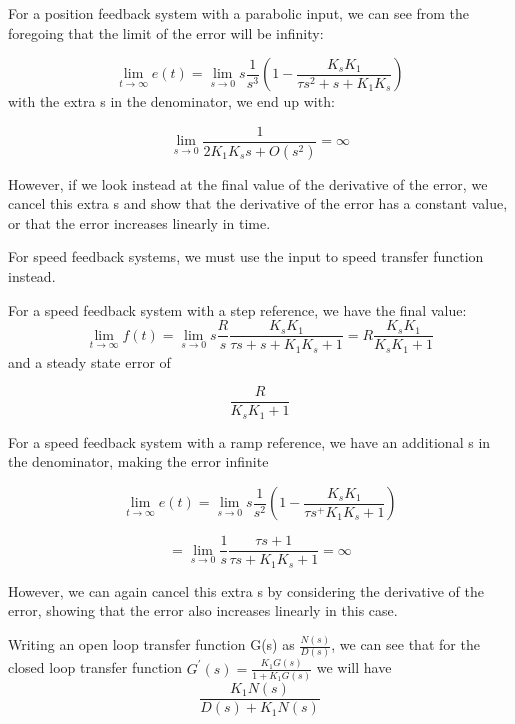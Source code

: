 \documentclass[11pt,a4paper]{article}
\begin{document}
\begin{enumerate}
For a position feedback system with a parabolic input, we can see from the foregoing that the limit of the error will be infinity:

\begin{equation}
	\lim_{t \to \infty} e(t) 
	= \lim_{s \to 0}s\frac{1}{s^{3}}(1 - \frac{K_{s}K_{1}}{\tau s^{2} + s + K_{1}K_{s}})
\end{equation}
with the extra s in the denominator, we end up with:

\begin{equation}
	\lim_{s \to 0}\frac{1}{2K_{1}K_{s}s + O(s^{2})} = \infty
\end{equation}


However, if we look instead at the final value of the derivative of the error, we cancel this extra s and show that the derivative of the error has a constant value, or that the error increases linearly in time.

For speed feedback systems, we must use the input to speed transfer function instead.

For a speed feedback system with a step reference, we have the final value:
\begin{equation}
	\lim_{t \to \infty} f(t) = \lim_{s \to 0}s\frac{R}{s}\frac{K_{s}K_{1}}{\tau s + s + K_{1}K_{s} + 1} = R \frac{K_{s}K_{1}}{K_{s}K_{1}+1}
\end{equation}
and a steady state error of

\begin{equation}
	\frac{R}{K_{s}K_{1} + 1}
\end{equation}

For a speed feedback system with a ramp reference, we have an additional s in the denominator, making the error infinite

\begin{equation}
	\lim_{t \to \infty} e(t) 
	= \lim_{s \to 0}s\frac{1}{s^{2}}(1 - \frac{K_{s}K_{1}}{\tau s^ +  K_{1}K_{s} + 1})
\end{equation}

\begin{equation}
	= \lim_{s \to 0}\frac{1}{s}\frac{\tau s + 1}{\tau s +  K_{1}K_{s} + 1} = \infty
\end{equation}

However, we can again cancel this extra s by considering the derivative of the error, showing that the error also increases linearly in this case. 

Writing an open loop transfer function G(s) as $\frac{N(s)}{D(s)}$, we can see that for the closed loop transfer function $G^{\prime}(s) = \frac{K_{1}G(s)}{1+K_{1}G(s)}$ we will have 
\begin{equation}
	\frac{K_{1}N(s)}{D(s) + K_{1}N(s)}
\end{equation}


\end{enumerate}
\end{document}

